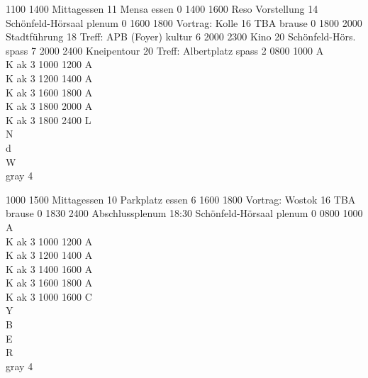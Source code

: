 \documentclass[a5paper,9pt]{scrreprt}
\begin{document}
\begin{center}
\begin{timetable}
   {1100} {1400} {Mittagessen}      {11} {Mensa}        {} {essen}   {0}
   {1400} {1600} {Reso Vorstellung} {14} {Schönfeld-Hörsaal}               {} {plenum}  {0}
   {1600} {1800} {Vortrag: Kolle}   {16} {TBA}               {} {brause}  {0}
   {1800} {2000} {Stadtführung}     {18} {Treff: APB (Foyer)}    {} {kultur} {6}
   {2000} {2300} {Kino}             {20} {Schönfeld-Hörs.}         {} {spass}   {7}
   {2000} {2400} {Kneipentour}      {20} {Treff: Albertplatz}    {} {spass}   {2}
   {0800} {1000} {\hfill A\\ \hfill K} {} {}               {} {ak}      {3}
   {1000} {1200} {\hfill A\\ \hfill K} {} {}               {} {ak}      {3}
   {1200} {1400} {\hfill A\\ \hfill K} {} {}               {} {ak}      {3}
   {1600} {1800} {\hfill A\\ \hfill K} {} {}               {} {ak}      {3}
   {1800} {2000} {\hfill A\\ \hfill K} {} {}               {} {ak}      {3}
   {1800} {2400} {L\\ N\\ d\\ W\\}       {} {}               {} {gray} {4}

   {1000} {1500} {Mittagessen}      {10} {Parkplatz}  {} {essen}   {6}
   {1600} {1800} {Vortrag: Wostok}  {16} {TBA}               {} {brause}  {0}
   {1830} {2400} {Abschlussplenum}  {18:30} {Schönfeld-Hörsaal} {} {plenum}  {0}
   {0800} {1000} {\hfill A\\ \hfill K} {} {}               {} {ak}      {3}
   {1000} {1200} {\hfill A\\ \hfill K} {} {}               {} {ak}      {3}
   {1200} {1400} {\hfill A\\ \hfill K} {} {}               {} {ak}      {3}
   {1400} {1600} {\hfill A\\ \hfill K} {} {}               {} {ak}      {3}
   {1600} {1800} {\hfill A\\ \hfill K} {} {}               {} {ak}      {3}
   {1000} {1600} {C\\ Y\\ B\\ E\\ R\\}       {} {}               {}
  {gray} {4}
\end{timetable}
\end{center}
\end{document}
